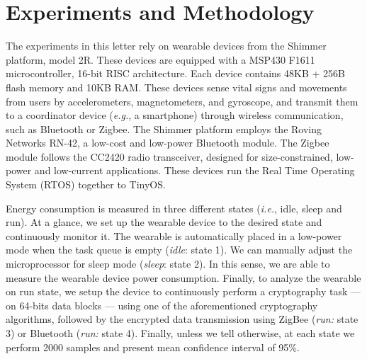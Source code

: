 \documentclass[journal]{IEEEtran}
\begin{document}
\section{Experiments and Methodology}
%
\label{sec:Methodology}

The experiments in this letter rely on wearable devices from the Shimmer platform, model 2R. These devices are equipped with a MSP430 F1611 microcontroller, 16-bit RISC architecture. Each device contains 48KB + 256B flash memory and 10KB RAM. These devices sense vital signs and movements from users by accelerometers, magnetometers, and gyroscope, and transmit them to a coordinator device ({\em e.g.}, a smartphone) through wireless communication, such as Bluetooth or Zigbee. The Shimmer platform employs the Roving Networks RN-42, a low-cost and low-power Bluetooth module. The Zigbee module follows the CC2420 radio transceiver, designed for size-constrained, low-power and low-current applications. These devices run the Real Time Operating System (RTOS) together to TinyOS. %

Energy consumption is measured in three different states ({\em i.e.}, idle, sleep and run). At a glance, we set up the wearable device to the desired state and continuously monitor it. The wearable is automatically placed in a low-power mode when the task queue is empty (\textit{idle}: state 1). We can manually adjust the microprocessor for sleep mode (\textit{sleep}: state 2). In this sense, we are able to measure the wearable device power consumption. Finally, to analyze the wearable on run state, we setup the device to continuously perform a cryptography task --- on 64-bits data blocks --- using one of the aforementioned cryptography algorithms, followed by the encrypted data transmission using ZigBee ({\em run:} state 3) or Bluetooth ({\em run:} state 4). Finally, unless we tell otherwise, at each state we perform 2000 samples and present mean confidence interval of 95\%.
\end{document}
